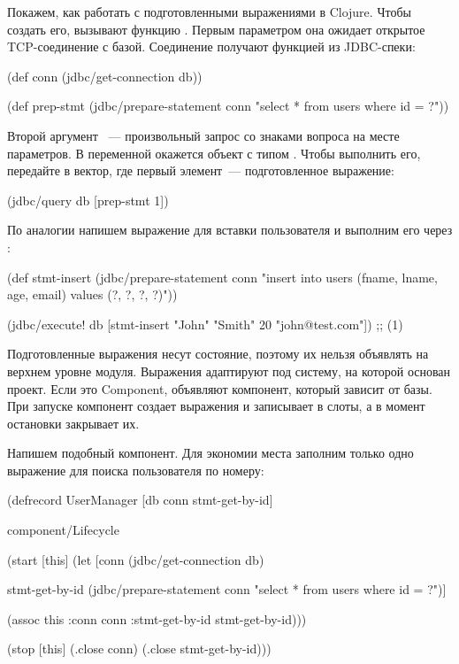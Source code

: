 Покажем, как работать с подготовленными выражениями в Clojure. Чтобы создать его, вызывают функцию . Первым параметром она ожидает открытое TCP-соединение с базой. Соединение получают функцией  из JDBC-спеки:

\begin{english}
  \begin{clojure}
(def conn
  (jdbc/get-connection db))

(def prep-stmt
  (jdbc/prepare-statement conn "select * from users where id = ?"))
  \end{clojure}
\end{english}

Второй аргумент ~--- произвольный запрос со знаками вопроса на месте параметров. В переменной  окажется объект с типом . Чтобы выполнить его, передайте в  вектор, где первый элемент~--- подготовленное выражение:

\begin{english}
  \begin{clojure}
(jdbc/query db [prep-stmt 1])
  \end{clojure}
\end{english}

По аналогии напишем выражение для вставки пользователя и выполним его через :

\begin{english}
  \begin{clojure}
(def stmt-insert
  (jdbc/prepare-statement conn "insert into users (fname, lname, age, email) values (?, ?, ?, ?)"))

(jdbc/execute! db [stmt-insert "John" "Smith" 20 "john@test.com"])
;; (1)
  \end{clojure}
\end{english}

Подготовленные выражения несут состояние, поэтому их нельзя объявлять на верхнем уровне модуля. Выражения адаптируют под систему, на которой основан проект. Если это Component, объявляют компонент, который зависит от базы. При запуске компонент создает выражения и записывает в слоты, а в момент остановки закрывает их.

Напишем подобный компонент. Для экономии места заполним только одно выражение для поиска пользователя по номеру:

\begin{english}
  \begin{clojure}
(defrecord UserManager
    [db
     conn
     stmt-get-by-id]

  component/Lifecycle

  (start [this]
    (let [conn (jdbc/get-connection db)

          stmt-get-by-id
          (jdbc/prepare-statement conn "select * from users where id = ?")]

      (assoc this
             :conn conn
             :stmt-get-by-id stmt-get-by-id)))

  (stop [this]
    (.close conn)
    (.close stmt-get-by-id)))
  \end{clojure}
\end{english}

